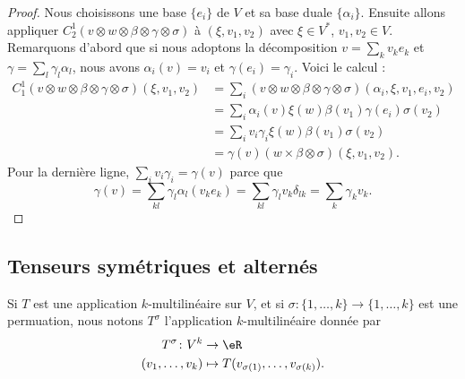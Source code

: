 \begin{proof}
	Nous choisissons une base \( \{ e_i \}\) de \( V\) et sa base duale \( \{ \alpha_i \}\). Ensuite allons appliquer \( C_2^1(v\otimes w\otimes \beta\otimes \gamma\otimes \sigma)\) à \( (\xi,v_1,v_2)\) avec \( \xi\in V^*\), \( v_1,v_2\in V\). Remarquons d'abord que si nous adoptons la décomposition \( v=\sum_kv_ke_k\) et \( \gamma=\sum_l\gamma_l\alpha_l\), nous avons \( \alpha_i(v)=v_i\) et \( \gamma(e_i)=\gamma_i\). Voici le calcul :
	\begin{subequations}
		\begin{align}
			C_1^1(v\otimes w\otimes \beta\otimes \gamma\otimes \sigma)(\xi,v_1,v_2) & = \sum_i(v\otimes w\otimes \beta\otimes \gamma\otimes \sigma)(\alpha_i,\xi,v_1,e_i,v_2) \\
			                                                                        & =\sum_i \alpha_i(v)\xi(w)\beta(v_1)\gamma(e_i)\sigma(v_2)                               \\
			                                                                        & =\sum_iv_i\gamma_i\xi(w)\beta(v_1)\sigma(v_2)                                           \\
			                                                                        & =\gamma(v)(w\times \beta\otimes \sigma)(\xi,v_1,v_2).
		\end{align}
	\end{subequations}
	Pour la dernière ligne, \( \sum_iv_i\gamma_i=\gamma(v)\) parce que
	\begin{equation}
		\gamma(v)=\sum_{kl}\gamma_l\alpha_l(v_ke_k)=\sum_{kl}\gamma_lv_k\delta_{lk}=\sum_k\gamma_kv_k.
	\end{equation}
\end{proof}


\subsection{Tenseurs symétriques et alternés}

Si \( T\) est une application \( k\)-multilinéaire sur \( V\), et si \(\sigma \colon \{ 1,\ldots,k \}\to \{ 1,\ldots,k \}  \) est une permuation, nous notons \( T^{\sigma} \) l'application \( k\)-multilinéaire donnée par
\begin{equation}
	\begin{aligned}
		T^{\sigma}\colon V^k & \to \eR                                         \\
		(v_1,\ldots,v_k)     & \mapsto T(v_{\sigma(1)},\ldots, v_{\sigma(k)}).
	\end{aligned}
\end{equation}

